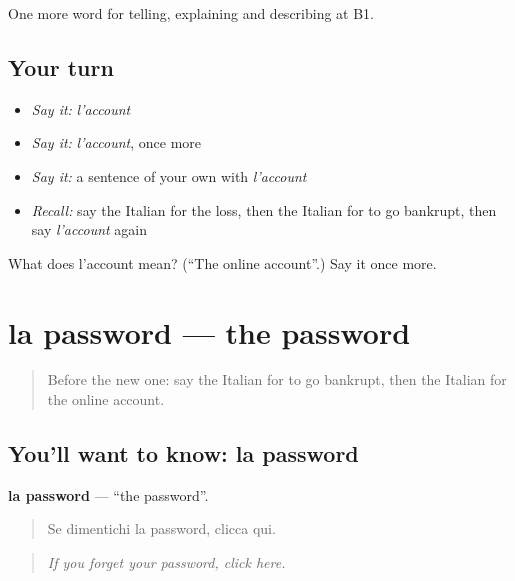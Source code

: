 \begin{grammarlens}[title={What you've built}]
One more word for telling, explaining and describing at B1.
\end{grammarlens}

\subsection*{Your turn}
\begin{itemize}
\raggedright
  \item \emph{Say it:} \emph{l'account}
  \item \emph{Say it:} \emph{l'account}, once more
  \item \emph{Say it:} a sentence of your own with \emph{l'account}
  \item \emph{Recall:} say the Italian for the loss, then the Italian for to go bankrupt, then say \emph{l'account} again
\end{itemize}

\begin{tcolorbox}[breakable,colback=teal!4,colframe=teal!35!black,title={Before you move on}]
What does l'account mean? (\textquotedblleft{}The online account\textquotedblright{}.) Say it once more.
\end{tcolorbox}
\section[la password]{la password — the password}

\label{lesson:IT-C399-password}



\begin{quote}
Before the new one: say the Italian for to go bankrupt, then the Italian for the online account.
\end{quote}

\subsection*{You'll want to know: la password}
\textbf{la password} — \textquotedblleft{}the password\textquotedblright{}.

\begin{quote}
Se dimentichi la password, clicca qui.
\end{quote}

\begin{quote}
\emph{If you forget your password, click here.}
\end{quote}

